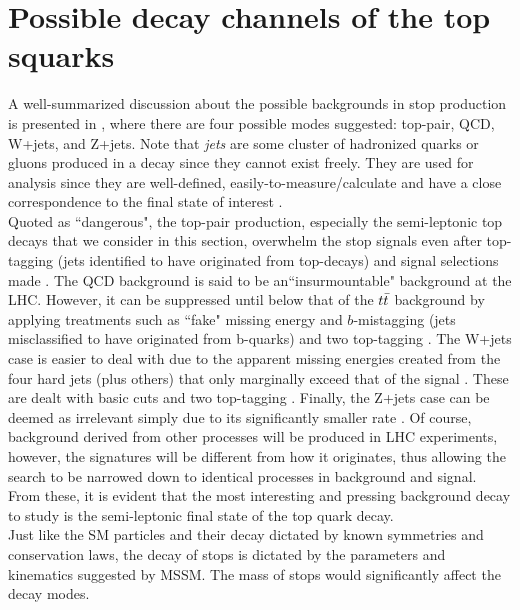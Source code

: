 \section{Possible decay channels of the top squarks} \label{sec:stopDecay}
A well-summarized discussion about the possible backgrounds in stop production is presented in \cite{plehn2010stop}, where there are four possible modes suggested: top-pair, QCD, W+jets, and Z+jets. Note that \textit{jets} are some cluster of hadronized quarks or gluons produced in a decay since they cannot exist freely. They are used for analysis since they are well-defined, easily-to-measure/calculate and have a close correspondence to the final state of interest \cite{seymour1996jets}. \\

Quoted as ``dangerous", the top-pair production, especially the semi-leptonic top decays that we consider in this section, overwhelm the stop signals even after top-tagging (jets identified to have originated from top-decays) and signal selections made \cite{plehn2010stop}. The QCD background is said to be an``insurmountable" background at the LHC. However, it can be suppressed until below that of the $t\Bar{t}$ background by applying treatments such as ``fake" missing energy and $b$-mistagging (jets misclassified to have originated from b-quarks) and two top-tagging \cite{plehn2010stop}. The W+jets case is easier to deal with due to the apparent missing energies created from the four hard jets (plus others) that only marginally exceed that of the signal \cite{plehn2010stop}. These are dealt with basic cuts and two top-tagging \cite{plehn2010stop}. Finally, the Z+jets case can be deemed as irrelevant simply due to its significantly smaller rate \cite{plehn2010stop}. Of course, background derived from other processes will be produced in LHC experiments, however, the signatures will be different from how it originates, thus allowing the search to be narrowed down to identical processes in background and signal. From these, it is evident that the most interesting and pressing background decay to study is the semi-leptonic final state of the top quark decay. \\

Just like the SM particles and their decay dictated by known symmetries and conservation laws, the decay of stops is dictated by the parameters and kinematics suggested by MSSM. The mass of stops would significantly affect the decay modes. \\

